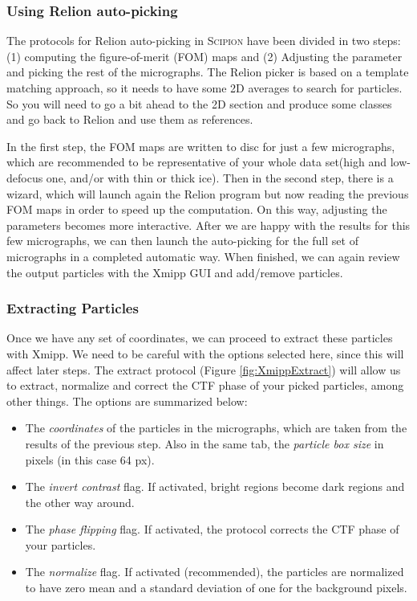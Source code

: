 \documentclass[12pt]{article} %
\newcommand{\scipion}{\textsc{Scipion} }
\begin{document}
\subsubsection{Using Relion auto-picking}
The protocols for Relion auto-picking in \scipion have been divided in two steps: (1) computing the figure-of-merit (FOM) maps and (2)
Adjusting the parameter and picking the rest of the micrographs. The Relion picker is based on a template matching approach, so it
needs to have some 2D averages to search for particles. So you will need to go a bit ahead to the 2D section and produce some classes
and go back to Relion and use them as references. 

In the first step, the FOM maps are written to disc for just a few micrographs, which are recommended to be representative of your whole
data set(high and low-defocus one, and/or with thin or thick ice). Then in the second step, there is a wizard, which will launch again
the Relion program but now reading the previous FOM maps in order to speed up the computation. On this way, adjusting the parameters becomes
more interactive. After we are happy with the results for this few micrographs, we can then launch the auto-picking for the full set 
of micrographs in a completed automatic way. When finished, we can again review the output particles with the Xmipp GUI and add/remove
particles.

\subsubsection{Extracting Particles}

Once we have any set of coordinates, we can proceed to extract these particles with Xmipp.
We need to be careful with the options selected here, since this will affect later steps.
The extract protocol (Figure \ref{fig:XmippExtract}) will allow us 
to extract, normalize and correct the CTF phase of your picked
particles, among other things. The options are summarized below:

\begin{itemize}
\item The \textit{coordinates} of the particles in the micrographs,
  which are taken from the results of the previous step. Also in the
  same tab, the \textit{particle box size} in pixels (in this case 64
  px).
\item The \textit{invert contrast} flag. If activated, bright
  regions become dark regions and the other way around. 

\item The \textit{phase flipping} flag. If activated,
  the protocol corrects the CTF phase of your particles. 

\item The \textit{normalize} flag. If activated (recommended), the
  particles are normalized to have zero mean and a standard deviation
  of one for the background pixels.
\end{itemize}
\end{document}
